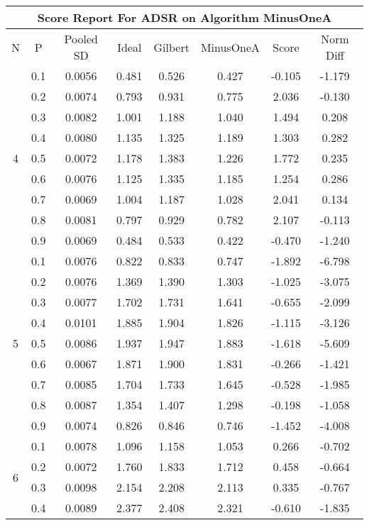 \documentclass[11pt,a4paper]{report}
\begin{document}
\begin{longtable}{ | c | c || c | c | c | c | c | c | }
\hline
\multicolumn{8}{|c|}{ Score Report For ADSR on Algorithm MinusOneA} \\
\hline
N & P & Pooled SD &  Ideal &  Gilbert & MinusOneA  & Score & Norm Diff \\
 \hline
 \hline
 \endhead
\multirow{9}{*}{4} & 0.1 & 0.0056 & 0.481 & 0.526 & 0.427 & -0.105 & -1.179 \\
 & 0.2 & 0.0074 & 0.793 & 0.931 & 0.775 & 2.036 & -0.130 \\
 & 0.3 & 0.0082 & 1.001 & 1.188 & 1.040 & 1.494 & 0.208 \\
 & 0.4 & 0.0080 & 1.135 & 1.325 & 1.189 & 1.303 & 0.282 \\
 & 0.5 & 0.0072 & 1.178 & 1.383 & 1.226 & 1.772 & 0.235 \\
 & 0.6 & 0.0076 & 1.125 & 1.335 & 1.185 & 1.254 & 0.286 \\
 & 0.7 & 0.0069 & 1.004 & 1.187 & 1.028 & 2.041 & 0.134 \\
 & 0.8 & 0.0081 & 0.797 & 0.929 & 0.782 & 2.107 & -0.113 \\
 & 0.9 & 0.0069 & 0.484 & 0.533 & 0.422 & -0.470 & -1.240 \\
 \hline
\multirow{9}{*}{5} & 0.1 & 0.0076 & 0.822 & 0.833 & 0.747 & -1.892 & -6.798 \\
 & 0.2 & 0.0076 & 1.369 & 1.390 & 1.303 & -1.025 & -3.075 \\
 & 0.3 & 0.0077 & 1.702 & 1.731 & 1.641 & -0.655 & -2.099 \\
 & 0.4 & 0.0101 & 1.885 & 1.904 & 1.826 & -1.115 & -3.126 \\
 & 0.5 & 0.0086 & 1.937 & 1.947 & 1.883 & -1.618 & -5.609 \\
 & 0.6 & 0.0067 & 1.871 & 1.900 & 1.831 & -0.266 & -1.421 \\
 & 0.7 & 0.0085 & 1.704 & 1.733 & 1.645 & -0.528 & -1.985 \\
 & 0.8 & 0.0087 & 1.354 & 1.407 & 1.298 & -0.198 & -1.058 \\
 & 0.9 & 0.0074 & 0.826 & 0.846 & 0.746 & -1.452 & -4.008 \\
 \hline
\multirow{9}{*}{6} & 0.1 & 0.0078 & 1.096 & 1.158 & 1.053 & 0.266 & -0.702 \\
 & 0.2 & 0.0072 & 1.760 & 1.833 & 1.712 & 0.458 & -0.664 \\
 & 0.3 & 0.0098 & 2.154 & 2.208 & 2.113 & 0.335 & -0.767 \\
 & 0.4 & 0.0089 & 2.377 & 2.408 & 2.321 & -0.610 & -1.835 \\

\end{longtable}
\end{document}
